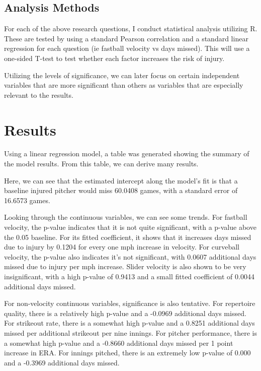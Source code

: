 \documentclass{article}
\begin{document}
\subsection{Analysis Methods}
For each of the above research questions, I conduct statistical analysis utilizing R. These are tested by using a standard Pearson correlation and a standard linear regression for each question (ie fastball velocity vs days missed). This will use a one-sided T-test to test whether each factor increases the risk of injury. 

Utilizing the levels of significance, we can later focus on certain independent variables that are more significant than others as variables that are especially relevant to the results.

\section{Results}

Using a linear regression model, a table was generated showing the summary of the model results. From this table, we can derive many results.

Here, we can see that the estimated intercept along the model's fit is that a baseline injured pitcher would miss 60.0408 games, with a standard error of 16.6573 games. 

Looking through the continuous variables, we can see some trends. For fastball velocity, the p-value indicates that it is not quite significant, with a p-value above the 0.05 baseline. For its fitted coefficient, it shows that it increases days missed due to injury by 0.1204 for every one mph increase in velocity. For curveball velocity, the p-value also indicates it's not significant, with 0.0607 additional days missed due to injury per mph increase. Slider velocity is also shown to be very insignificant, with a high p-value of 0.9413 and a small fitted coefficient of 0.0044 additional days missed.

For non-velocity continuous variables, significance is also tentative. For repertoire quality, there is a relatively high p-value and a -0.0969 additional days missed. For strikeout rate, there is a somewhat high p-value and a 0.8251 additional days missed per additional strikeout per nine innings. For pitcher performance, there is a somewhat high p-value and a -0.8660 additional days missed per 1 point increase in ERA. For innings pitched, there is an extremely low p-value of 0.000 and a -0.3969 additional days missed.
\end{document}
